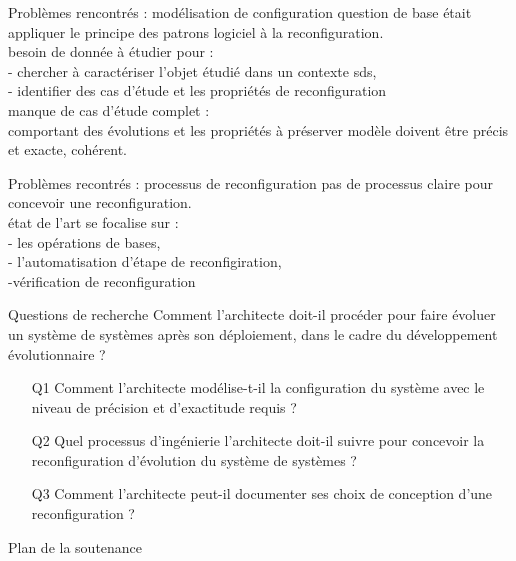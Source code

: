 \begin{frame}{Problèmes rencontrés : modélisation de configuration}
question de base était appliquer le principe des patrons logiciel à la reconfiguration. \\
besoin de donnée à étudier pour : \\
- chercher à caractériser l'objet étudié dans un contexte sds, \\
- identifier des cas d'étude et les propriétés de reconfiguration \\
manque de cas d'étude complet : \\
comportant des évolutions et les propriétés à préserver 
modèle doivent être précis et exacte, cohérent.
\end{frame}

\begin{frame}{Problèmes recontrés : processus de reconfiguration}
pas de processus claire pour concevoir une 
reconfiguration. \\
état de l'art se focalise sur :\\
- les opérations de bases, \\
- l'automatisation d'étape de reconfigiration, \\
-vérification de reconfiguration\\
\end{frame}

\begin{frame}{Questions de recherche}
Comment l’architecte doit-il procéder pour faire évoluer un système de systèmes après son déploiement, dans le cadre du développement évolutionnaire ?\\
\begin{itemize}
    \item[Q1] Comment l’architecte modélise-t-il la configuration du système avec le niveau de précision et d’exactitude requis ?
    \item[Q2] Quel processus d’ingénierie l’architecte doit-il suivre pour concevoir la reconfiguration d’évolution du système de systèmes ?
    \item[Q3] Comment l’architecte peut-il documenter ses choix de conception d’une reconfiguration ?
\end{itemize}
\end{frame}

\begin{frame}{Plan de la soutenance}
\tableofcontents
\end{frame}